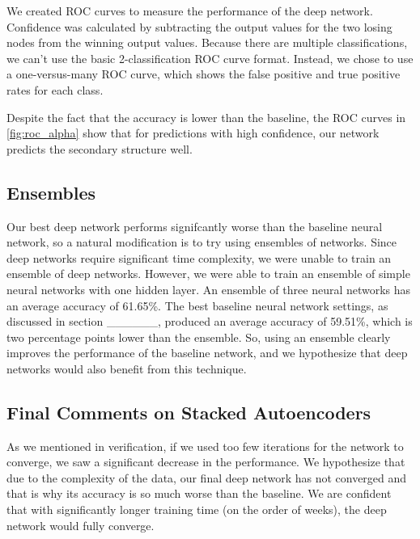\documentclass[letterpaper,twocolumn,12pt]{article}
\begin{document}
We created ROC curves to measure the performance of the deep network.
Confidence was calculated by subtracting the output values for the two losing nodes from the winning output values.
Because there are multiple classifications, we can't use the basic 2-classification ROC curve format.
Instead, we chose to use a one-versus-many ROC curve, which shows the false positive and true positive rates for each class.



Despite the fact that the accuracy is lower than the baseline, the ROC curves in \ref{fig:roc_alpha} show that for predictions with high confidence, our network predicts the secondary structure well.

\subsection{Ensembles}
Our best deep network performs signifcantly worse than the baseline neural network, so a natural modification is to try using ensembles of networks.
Since deep networks require significant time complexity, we were unable to train an ensemble of deep networks.
However, we were able to train an ensemble of simple neural networks with one hidden layer.
An ensemble of three neural networks has an average accuracy of 61.65\%.
The best baseline neural network settings, as discussed in section ______,  produced an average accuracy of 59.51\%, which is two percentage points lower than the ensemble.
So, using an ensemble clearly improves the performance of the baseline network, and we hypothesize that deep networks would also benefit from this technique.



\subsection{Final Comments on Stacked Autoencoders}
As we mentioned in verification, if we used too few iterations for the network to converge, we saw a significant decrease in the performance.
We hypothesize that due to the complexity of the data, our final deep network has not converged and that is why its accuracy is so much worse than the baseline.
We are confident that with significantly longer training time (on the order of weeks), the deep network would fully converge.
\end{document}
